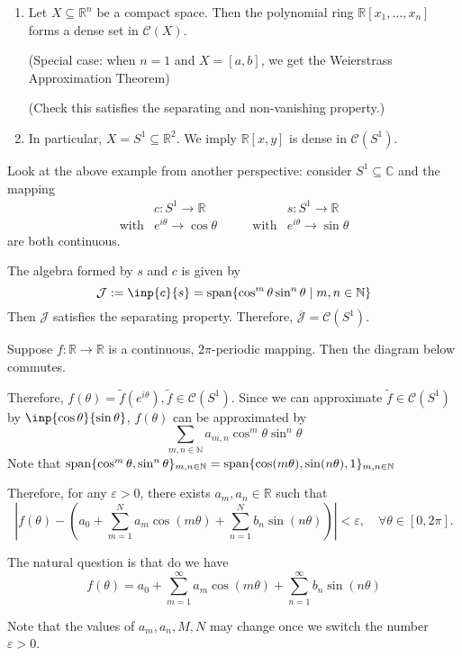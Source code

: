 \begin{example}
\begin{enumerate}
\item
Let $X\subseteq\mathbb{R}^n$ be a compact space. 
Then the polynomial ring $\mathbb{R}[x_1,\dots,x_n]$ forms a dense set in $\mathcal{C}(X)$.

(Special case: when $n=1$ and $X=[a,b]$, we get the Weierstrass Approximation Theorem)

(Check this satisfies the separating and non-vanishing property.)
\item
In particular, $X=S^1\subseteq\mathbb{R}^2$. We imply $\mathbb{R}[x,y]$ is dense in $\mathcal{C}(S^1)$.
\end{enumerate}
\end{example}
Look at the above example from another perspective: consider $S^1\subseteq\mathbb{C}$ and the mapping
\[
\begin{array}{ll}
&c:S^1\to\mathbb{R}\\
\text{with}&e^{i\theta}\to\cos\theta
\end{array}\qquad
\begin{array}{ll}
&s:S^1\to\mathbb{R}\\
\text{with}&e^{i\theta}\to\sin\theta
\end{array}
\]
are both continuous.

The algebra formed by $s$ and $c$ is given by
\[
\mathcal{J}:=\inp{c}{s}=\Span\{\cos^m\theta \sin^n\theta\mid m,n\in\mathbb{N}\}
\]
Then $\mathcal{J}$ satisfies the separating property. Therefore, $\overline{\mathcal{J}} = \mathcal{C}(S^1)$.

Suppose $f:\mathbb{R}\to\mathbb{R}$ is a continuous, $2\pi$-periodic mapping. Then the diagram below commutes.

Therefore, $f(\theta) = \tilde{f}(e^{i\theta}), \tilde{f}\in\mathcal{C}(S^1)$.
Since we can approximate $\tilde{f}\in\mathcal{C}(S^1)$ by $\inp{\cos\theta}{\sin\theta}$, $f(\theta)$ can be approximated by
\[
\sum_{m,n\in\mathbb{N}}a_{m,n}\cos^m\theta\sin^n\theta
\]
Note that $\operatorname{span}\{\cos^m\theta,\sin^n\theta\}_{m,n\in\mathbb{N}} = \operatorname{span}\{\cos(m\theta),\sin(n\theta),1\}_{m,n\in\mathbb{N}}$

Therefore, for any $\varepsilon>0$, there exists $a_m,a_n\in\mathbb{R}$ such that 
\[
\left|f(\theta) - 
\left(
a_0+\sum_{m=1}^Na_m\cos(m\theta) + \sum_{n=1}^Nb_n\sin(n\theta)
\right)
\right|<\varepsilon,\quad
\forall\theta\in[0,2\pi].
\]

The natural question is that do we have
\[
f(\theta) = a_0 + \sum_{m=1}^\infty a_m\cos(m\theta) + \sum_{n=1}^\infty b_n\sin(n\theta)
\]
\begin{remark}
Note that the values of $a_m,a_n,M,N$ may change once we switch the number $\varepsilon>0$. 
\end{remark}
